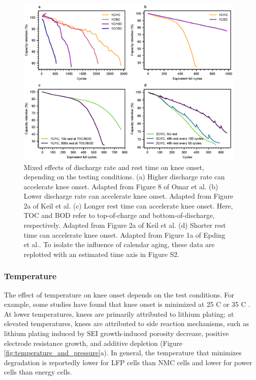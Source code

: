 \documentclass[journal=jpclcd,manuscript=article]{achemso}
\begin{document}
\begin{figure}[ht!]
\centering
\includegraphics[scale = 1.0]{figures/discharge_rate_rest_cycles.eps}
\caption{Mixed effects of discharge rate and rest time on knee onset, depending on the testing conditions. (a) Higher discharge rate can accelerate knee onset. Adapted from Figure 8 of Omar et al.\cite{omar_lithium_2014} (b) Lower discharge rate can accelerate knee onset. Adapted from Figure 2a of Keil et al.\cite{keil_linear_2019} (c) Longer rest time can accelerate knee onset. Here, TOC and BOD refer to top-of-charge and bottom-of-discharge, respectively. Adapted from  Figure 2a of Keil et al.\cite{keil_linear_2019} (d) Shorter rest time can accelerate knee onset. Adapted from Figure 1a of Epding et al.\cite{epding_investigation_2019}. To isolate the influence of calendar aging, these data are replotted with an estimated time axis in Figure S2.}
\label{fig:discharge-rest_cycle}
\end{figure}


\subsubsection{Temperature}
The effect of temperature on knee onset depends on the test conditions. For example, some studies have found that knee onset is minimized at 25 \degree C \cite{zhang_accelerated_2019, waldmann_temperature_2014, waldmann_optimization_2015} or 35 \degree C \cite{schuster_nonlinear_2015}. At lower temperatures, knees are primarily attributed to lithium plating; at elevated temperatures, knees are attributed to side reaction mechanisms, such as lithium plating induced by SEI growth-induced porosity decrease, positive electrode resistance growth, and additive depletion (Figure \ref{fig:temperature_and_pressure}a).\cite{zhang_accelerated_2019,schuster_nonlinear_2015,waldmann_temperature_2014,waldmann_optimization_2015} In general, the temperature that minimizes degradation is reportedly lower for LFP cells than NMC cells \cite{preger_degradation_2020} and lower for power cells than energy cells\cite{yang_understanding_2018}.
\end{document}
